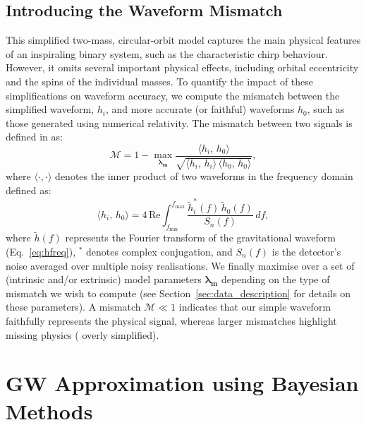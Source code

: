\documentclass{ucdgradtaughtthesis}
\begin{document}
\subsection{Introducing the Waveform Mismatch}
\label{subsec:mismatch_intro}
%
%
This simplified two-mass, circular-orbit model captures the main physical features of an inspiraling binary system, such as the characteristic chirp behaviour.
However, it omits several important physical effects, including orbital eccentricity and the spins of the individual masses. 
To quantify the impact of these simplifications on waveform accuracy, we compute the mismatch between the simplified waveform, 
\( h_i \), and more accurate (or faithful) waveforms \( h_0 \), such as those generated using numerical relativity.
The mismatch between two signals is defined in \cite{mismatch, Ogpaper} as:
%
\begin{equation}
\label{eq:mismatch_def}
\mathcal{M} = 1 - \max_{\boldsymbol{\lambda_m}}
\frac{\langle h_i,\,h_0 \rangle}{\sqrt{\langle h_i,\,h_i \rangle \,\langle h_0,\,h_0 \rangle}},
\end{equation}
%
where \( \langle \cdot, \cdot \rangle \) denotes the inner product of two waveforms in the frequency domain defined as:
%
\begin{equation}
\langle h_i,\,h_0 \rangle = 4\,\mathrm{Re} \int_{f_{\text{min}}}^{f_{\text{max}}} \frac{\tilde{h}_i^*(f)\,\tilde{h}_0(f)}{S_n(f)}\,df,
\end{equation}
%
where \( \tilde{h}(f) \) represents the Fourier transform of the gravitational waveform (Eq.~\eqref{eq:hfreq}), \( ^* \) denotes complex conjugation, and \( S_n(f) \) is the detector’s noise averaged over multiple noisy realisations.
We finally maximise over a set of (intrinsic and/or extrinsic) model parameters \(\mathbf{\lambda_m}\) depending on the type of mismatch we wish to compute
 (see Section~\ref{sec:data_description} for details on these parameters).
A mismatch \(\mathcal{M}\ll 1\) indicates that our simple waveform
faithfully represents the physical signal, whereas larger mismatches highlight missing
physics ( overly simplified).




\section{GW Approximation using Bayesian Methods}
\label{sec:GW_and_Bayes}
\end{document}
